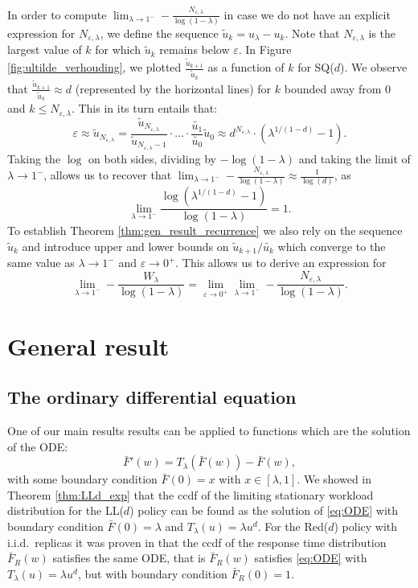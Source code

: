 \documentclass[12pt]{report}
\begin{document}
In order to compute  $\lim_{\lambda \rightarrow 1^-} -\frac{N_{\varepsilon, \lambda}}{\log(1-\lambda)}$ in case we do not have an explicit expression for $N_{\varepsilon, \lambda}$,
we define the sequence $\tilde{u}_k=u_\lambda-u_k$.  Note that $N_{\varepsilon, \lambda}$ is the
largest value of $k$ for which $\tilde u_k$ remains below $\varepsilon$.
In Figure \ref{fig:ultilde_verhouding}, we plotted $\frac{\tilde u_{k+1}}{\tilde u_k}$ as a function of $k$ for SQ($d$). We observe that $\frac{\tilde u_{k+1}}{\tilde u_k} \approx d$ (represented by the horizontal lines) for $k$ bounded away from $0$ and $k \leq N_{\varepsilon, \lambda}$. This in its turn entails that:
$$
\varepsilon \approx \tilde u_{N_{\varepsilon, \lambda}} = \frac{\tilde u_{N_{\varepsilon, \lambda}}}{\tilde u_{N_{\varepsilon, \lambda}-1}} \cdot \dots \cdot \frac{\tilde{u_1}}{\tilde{u_0}} \tilde u_0 \approx d^{N_{\varepsilon, \lambda}} \cdot ( \lambda^{1/(1-d)} -1 ).
$$
Taking the $\log$ on both sides, dividing by $-\log(1-\lambda)$ and taking the limit of $\lambda \rightarrow 1^-$, allows us to recover that $\lim_{\lambda \rightarrow 1^-} - \frac{N_{\varepsilon, \lambda}}{\log(1-\lambda)} \approx \frac{1}{\log(d)}$, as 
$$
\lim_{\lambda \rightarrow 1^-} \frac{\log(\lambda^{1/(1-d)}-1)}{\log(1-\lambda)} = 1.
$$
To establish Theorem \ref{thm:gen_result_recurrence} we also rely on the sequence $\tilde u_k$
and introduce upper and lower bounds on $\tilde u_{k+1}/\tilde{u_k}$ which converge to the same value as $\lambda\rightarrow 1^-$ and $\varepsilon \rightarrow 0^+$. This allows us to derive an
expression for
$$
\lim_{\lambda \rightarrow 1^-} -\frac{W_\lambda}{\log(1-\lambda)}
=
\lim_{\varepsilon\rightarrow 0^+}\lim_{\lambda \rightarrow 1^-} -\frac{N_{\varepsilon, \lambda}}{\log(1-\lambda)}.
$$

\section{General result}\label{sec:general}
\subsection{The ordinary differential equation} \label{sec:ODE}
One of our main results results can be applied to functions which are the solution of the ODE:
\begin{equation}
\bar F'(w) = T_\lambda(\bar F(w)) - \bar F(w), \label{eq:ODE}
\end{equation}
with some boundary condition $\bar F(0) =x$ with $x \in [\lambda,1]$. We showed in Theorem \ref{thm:LLd_exp} that the ccdf of the limiting stationary workload distribution for the LL($d$) policy can be found as the solution of \eqref{eq:ODE} with boundary condition $\bar F(0) = \lambda$ and $T_\lambda(u) = \lambda u^d$. For the Red($d$) policy with i.i.d.~replicas it was proven in \cite{gardnerSIGM} that the ccdf of the response time distribution $\bar F_R(w)$ satisfies the same ODE, that is $\bar F_R(w)$ satisfies \eqref{eq:ODE} with $T_\lambda(u) = \lambda u^d$, but with boundary condition $\bar F_R(0) = 1$.
\end{document}
